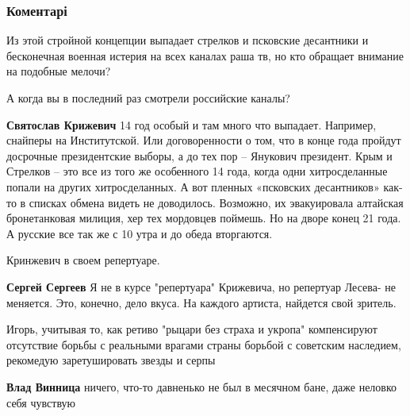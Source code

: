  
 
 
 
 
\subsubsection{Коментарі}
\label{sec:17_11_2021.fb.lesev_igor.1.kogda_russkie_napadut.cmt}

\begin{itemize} %
Из этой стройной концепции выпадает стрелков и псковские десантники и бесконечная военная истерия на всех каналах раша тв, но кто обращает внимание на подобные мелочи?

\begin{itemize} %
А когда вы в последний раз смотрели российские каналы?

\textbf{Святослав Крижевич} 14 год особый и там много что выпадает. Например, снайперы на Институтской. Или договоренности о том, что в конце года пройдут досрочные президентские выборы, а до тех пор – Янукович президент. Крым и Стрелков – это все из того же особенного 14 года, когда одни хитросделанные попали на других хитросделанных. А вот пленных «псковских десантников» как-то в списках обмена видеть не доводилось. Возможно, их эвакуировала алтайская бронетанковая милиция, хер тех мордовцев поймешь. Но на дворе конец 21 года. А русские все так же с 10 утра и до обеда вторгаются.

Кринжевич в своем репертуаре.

\textbf{Сергей Сергеев} Я не в курсе "репертуара" Крижевича, но репертуар Лесева- не меняется. Это, конечно, дело вкуса. На каждого артиста, найдется свой зритель.
\end{itemize} %


Игорь, учитывая то, как ретиво "рыцари без страха и укропа" компенсируют
отсутствие борьбы с реальными врагами страны борьбой с советским наследием,
рекомедую заретушировать звезды и серпы

\begin{itemize} %
\textbf{Влад Винница} ничего, что-то давненько не был в месячном бане, даже неловко себя чувствую


\end{itemize}
\end{itemize}
